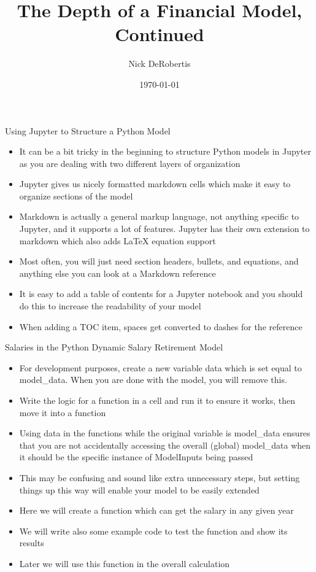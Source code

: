 \documentclass[]{article}
\begin{document}
\title{The Depth of a Financial Model, Continued}
\author{Nick DeRobertis}
\date{\today}
\maketitle
\begin{section}{Using Jupyter to Structure a Python Model}
\begin{itemize}
\item It can be a bit tricky in the beginning to structure Python models in Jupyter as you are dealing with two different layers of organization
\item Jupyter gives us nicely formatted markdown cells which make it easy to organize sections of the model
\item Markdown is actually a general markup language, not anything specific to Jupyter, and it supports a lot of features. Jupyter has their own extension to markdown which also adds LaTeX equation support
\item Most often, you will just need section headers, bullets, and equations, and anything else you can look at a Markdown reference
\item It is easy to add a table of contents for a Jupyter notebook and you should do this to increase the readability of your model
\item When adding a TOC item, spaces get converted to dashes for the reference
\end{itemize}
\end{section}
\begin{section}{Salaries in the Python Dynamic Salary Retirement Model}
\begin{itemize}
\item For development purposes, create a new variable data which is set equal to model\_data. When you are done with the model, you will remove this.
\item Write the logic for a function in a cell and run it to ensure it works, then move it into a function
\item Using data in the functions while the original variable is model\_data ensures that you are not accidentally accessing the overall (global) model\_data when it should be the specific instance of ModelInputs being passed
\item This may be confusing and sound like extra unnecessary steps, but setting things up this way will enable your model to be easily extended
\item Here we will create a function which can get the salary in any given year
\item We will write also some example code to test the function and show its results
\item Later we will use this function in the overall calculation
\end{itemize}
\end{section}
\end{document}
